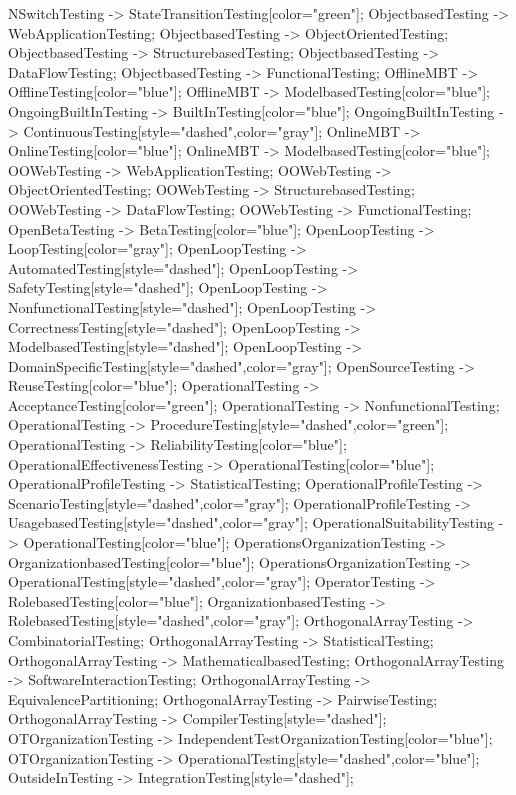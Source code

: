 \documentclass{article}
\begin{document}
{NSwitchTesting -> StateTransitionTesting[color="green"];
ObjectbasedTesting -> WebApplicationTesting;
ObjectbasedTesting -> ObjectOrientedTesting;
ObjectbasedTesting -> StructurebasedTesting;
ObjectbasedTesting -> DataFlowTesting;
ObjectbasedTesting -> FunctionalTesting;
OfflineMBT -> OfflineTesting[color="blue"];
OfflineMBT -> ModelbasedTesting[color="blue"];
OngoingBuiltInTesting -> BuiltInTesting[color="blue"];
OngoingBuiltInTesting -> ContinuousTesting[style="dashed",color="gray"];
OnlineMBT -> OnlineTesting[color="blue"];
OnlineMBT -> ModelbasedTesting[color="blue"];
OOWebTesting -> WebApplicationTesting;
OOWebTesting -> ObjectOrientedTesting;
OOWebTesting -> StructurebasedTesting;
OOWebTesting -> DataFlowTesting;
OOWebTesting -> FunctionalTesting;
OpenBetaTesting -> BetaTesting[color="blue"];
OpenLoopTesting -> LoopTesting[color="gray"];
OpenLoopTesting -> AutomatedTesting[style="dashed"];
OpenLoopTesting -> SafetyTesting[style="dashed"];
OpenLoopTesting -> NonfunctionalTesting[style="dashed"];
OpenLoopTesting -> CorrectnessTesting[style="dashed"];
OpenLoopTesting -> ModelbasedTesting[style="dashed"];
OpenLoopTesting -> DomainSpecificTesting[style="dashed",color="gray"];
OpenSourceTesting -> ReuseTesting[color="blue"];
OperationalTesting -> AcceptanceTesting[color="green"];
OperationalTesting -> NonfunctionalTesting;
OperationalTesting -> ProcedureTesting[style="dashed",color="green"];
OperationalTesting -> ReliabilityTesting[color="blue"];
OperationalEffectivenessTesting -> OperationalTesting[color="blue"];
OperationalProfileTesting -> StatisticalTesting;
OperationalProfileTesting -> ScenarioTesting[style="dashed",color="gray"];
OperationalProfileTesting -> UsagebasedTesting[style="dashed",color="gray"];
OperationalSuitabilityTesting -> OperationalTesting[color="blue"];
OperationsOrganizationTesting -> OrganizationbasedTesting[color="blue"];
OperationsOrganizationTesting -> OperationalTesting[style="dashed",color="gray"];
OperatorTesting -> RolebasedTesting[color="blue"];
OrganizationbasedTesting -> RolebasedTesting[style="dashed",color="gray"];
OrthogonalArrayTesting -> CombinatorialTesting;
OrthogonalArrayTesting -> StatisticalTesting;
OrthogonalArrayTesting -> MathematicalbasedTesting;
OrthogonalArrayTesting -> SoftwareInteractionTesting;
OrthogonalArrayTesting -> EquivalencePartitioning;
OrthogonalArrayTesting -> PairwiseTesting;
OrthogonalArrayTesting -> CompilerTesting[style="dashed"];
OTOrganizationTesting -> IndependentTestOrganizationTesting[color="blue"];
OTOrganizationTesting -> OperationalTesting[style="dashed",color="blue"];
OutsideInTesting -> IntegrationTesting[style="dashed"];
}
\end{document}
